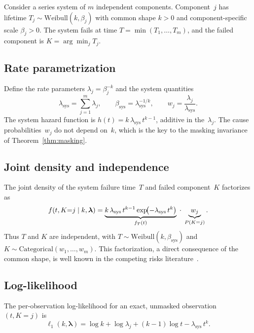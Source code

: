 \documentclass[12pt]{article}
\theoremstyle{remark}
\newcommand{\lsys}{\lambda_{\mathrm{sys}}}
\newcommand{\bsys}{\beta_{\mathrm{sys}}}
\begin{document}
Consider a series system of $m$ independent components.  Component~$j$
has lifetime $T_j \sim \mathrm{Weibull}(k, \beta_j)$ with common shape
$k > 0$ and component-specific scale $\beta_j > 0$.  The system fails at
time $T = \min(T_1, \ldots, T_m)$, and the failed component is
$K = \arg\min_j T_j$.

\subsection{Rate parametrization}

Define the rate parameters $\lambda_j = \beta_j^{-k}$ and the system
quantities
%
\begin{equation}\label{eq:system}
\lsys = \sum_{j=1}^m \lambda_j, \qquad
\bsys = \lsys^{-1/k}, \qquad
w_j = \frac{\lambda_j}{\lsys}.
\end{equation}
%
The system hazard function is $h(t) = k\,\lsys\,t^{k-1}$, additive in
the~$\lambda_j$.  The cause probabilities~$w_j$ do not depend on~$k$,
which is the key to the masking invariance of
Theorem~\ref{thm:masking}.

\subsection{Joint density and independence}

The joint density of the system failure time~$T$ and failed
component~$K$ factorizes as
%
\begin{equation}\label{eq:joint}
f(t, K{=}j \mid k, \bm{\lambda})
= \underbrace{k\,\lsys\,t^{k-1}
  \exp\!\bigl(-\lsys\,t^k\bigr)}_{f_T(t)}
  \;\cdot\; \underbrace{w_j\vphantom{t^{k-1}}}_{P(K=j)}.
\end{equation}
%
Thus $T$ and $K$ are independent, with
$T \sim \mathrm{Weibull}(k, \bsys)$ and
$K \sim \mathrm{Categorical}(w_1, \ldots, w_m)$.  This factorization,
a direct consequence of the common shape, is well known in the competing
risks literature~\citep{crowder2001, pareek2009}.

\subsection{Log-likelihood}

The per-observation log-likelihood for an exact, unmasked observation
$(t, K{=}j)$ is
%
\begin{equation}\label{eq:loglik}
\ell_1(k, \bm{\lambda})
= \log k + \log \lambda_j + (k-1)\log t - \lsys\,t^k.
\end{equation}
\end{document}
